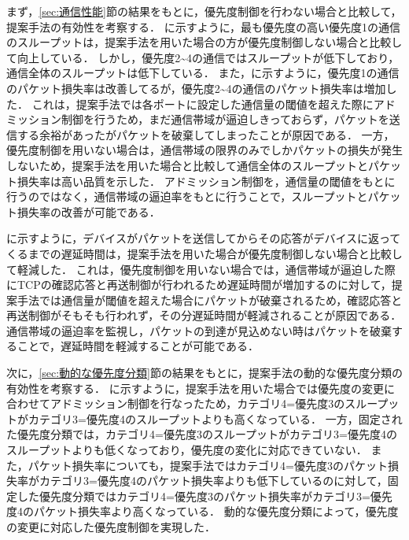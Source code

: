 \documentclass[a4paper,11pt,uplatex]{ujreport}
\begin{document}
  まず，\ref{sec:通信性能}節の結果をもとに，優先度制御を行わない場合と比較して，提案手法の有効性を考察する．
  に示すように，最も優先度の高い優先度1の通信のスループットは，提案手法を用いた場合の方が優先度制御しない場合と比較して向上している．
  しかし，優先度2\textasciitilde4の通信ではスループットが低下しており，通信全体のスループットは低下している．
  また，に示すように，優先度1の通信のパケット損失率は改善してるが，優先度2\textasciitilde4の通信のパケット損失率は増加した．
  これは，提案手法では各ポートに設定した通信量の閾値を超えた際にアドミッション制御を行うため，まだ通信帯域が逼迫しきっておらず，パケットを送信する余裕があったがパケットを破棄してしまったことが原因である．
  一方，優先度制御を用いない場合は，通信帯域の限界のみでしかパケットの損失が発生しないため，提案手法を用いた場合と比較して通信全体のスループットとパケット損失率は高い品質を示した．
  アドミッション制御を，通信量の閾値をもとに行うのではなく，通信帯域の逼迫率をもとに行うことで，スループットとパケット損失率の改善が可能である．\par

  に示すように，デバイスがパケットを送信してからその応答がデバイスに返ってくるまでの遅延時間は，提案手法を用いた場合が優先度制御しない場合と比較して軽減した．
  これは，優先度制御を用いない場合では，通信帯域が逼迫した際にTCPの確認応答と再送制御が行われるため遅延時間が増加するのに対して，提案手法では通信量が閾値を超えた場合にパケットが破棄されるため，確認応答と再送制御がそもそも行われず，その分遅延時間が軽減されることが原因である．
  通信帯域の逼迫率を監視し，パケットの到達が見込めない時はパケットを破棄することで，遅延時間を軽減することが可能である．\par

  次に，\ref{sec:動的な優先度分類}節の結果をもとに，提案手法の動的な優先度分類の有効性を考察する．
  に示すように，提案手法を用いた場合では優先度の変更に合わせてアドミッション制御を行なったため，カテゴリ4=優先度3のスループットがカテゴリ3=優先度4のスループットよりも高くなっている．
  一方，固定された優先度分類では，カテゴリ4=優先度3のスループットがカテゴリ3=優先度4のスループットよりも低くなっており，優先度の変化に対応できていない．
  また，パケット損失率についても，提案手法ではカテゴリ4=優先度3のパケット損失率がカテゴリ3=優先度4のパケット損失率よりも低下しているのに対して，固定した優先度分類ではカテゴリ4=優先度3のパケット損失率がカテゴリ3=優先度4のパケット損失率より高くなっている．
  動的な優先度分類によって，優先度の変更に対応した優先度制御を実現した．\par
\end{document}
